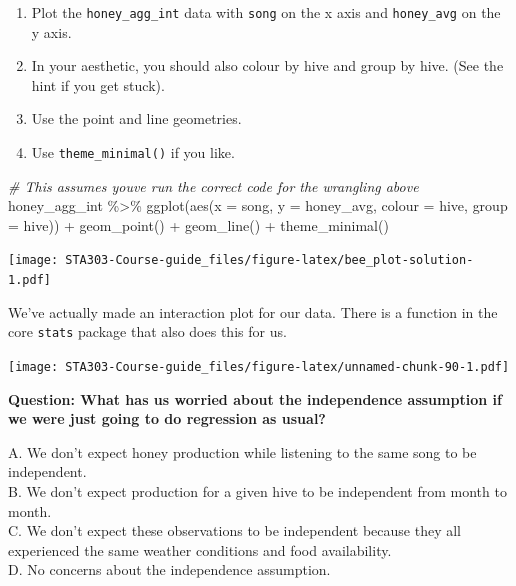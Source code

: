 \documentclass[
  openany]{book}
\newenvironment{Shaded}{\begin{snugshade}}{\end{snugshade}}
\newcommand{\AttributeTok}[1]{\textcolor[rgb]{0.77,0.63,0.00}{#1}}
\newcommand{\CommentTok}[1]{\textcolor[rgb]{0.56,0.35,0.01}{\textit{#1}}}
\newcommand{\FunctionTok}[1]{\textcolor[rgb]{0.00,0.00,0.00}{#1}}
\newcommand{\NormalTok}[1]{#1}
\newcommand{\SpecialCharTok}[1]{\textcolor[rgb]{0.00,0.00,0.00}{#1}}
\providecommand{\tightlist}{%
  \setlength{\itemsep}{0pt}\setlength{\parskip}{0pt}}
\begin{document}
\begin{enumerate}
\def\labelenumi{\arabic{enumi}.}
\tightlist
\item
  Plot the \texttt{honey\_agg\_int} data with \texttt{song} on the x axis and \texttt{honey\_avg} on the y axis.
\item
  In your aesthetic, you should also colour by hive and group by hive. (See the hint if you get stuck).
\item
  Use the point and line geometries.
\item
  Use \texttt{theme\_minimal()} if you like.
\end{enumerate}

\begin{Shaded}
\begin{Highlighting}[]
\CommentTok{\# This assumes you\textquotesingle{}ve run the correct code for the wrangling above}
\NormalTok{honey\_agg\_int }\SpecialCharTok{\%\textgreater{}\%} 
  \FunctionTok{ggplot}\NormalTok{(}\FunctionTok{aes}\NormalTok{(}\AttributeTok{x =}\NormalTok{ song, }\AttributeTok{y =}\NormalTok{ honey\_avg, }\AttributeTok{colour =}\NormalTok{ hive, }\AttributeTok{group =}\NormalTok{ hive)) }\SpecialCharTok{+}
  \FunctionTok{geom\_point}\NormalTok{() }\SpecialCharTok{+}
  \FunctionTok{geom\_line}\NormalTok{() }\SpecialCharTok{+}
  \FunctionTok{theme\_minimal}\NormalTok{()}
\end{Highlighting}
\end{Shaded}

\texttt{[image: STA303-Course-guide\_files/figure-latex/bee\_plot-solution-1.pdf]}

We've actually made an interaction plot for our data. There is a function in the core \texttt{stats} package that also does this for us.

\texttt{[image: STA303-Course-guide\_files/figure-latex/unnamed-chunk-90-1.pdf]}

\textbf{Question: What has us worried about the independence assumption if we were just going to do regression as usual?}

A. We don't expect honey production while listening to the same song to be independent.\\
B. We don't expect production for a given hive to be independent from month to month.\\
C. We don't expect these observations to be independent because they all experienced the same weather conditions and food availability.\\
D. No concerns about the independence assumption.
\end{document}
